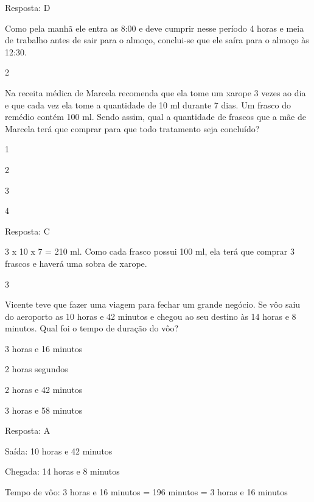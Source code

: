 Resposta: D

Como pela manhã ele entra as 8:00 e deve cumprir nesse período 4 horas e
meia de trabalho antes de sair para o almoço, conclui-se que ele saíra
para o almoço às 12:30.

\num{2}

Na receita médica de Marcela recomenda que ela tome um xarope 3 vezes ao
dia e que cada vez ela tome a quantidade de 10 ml durante 7 dias. Um
frasco do remédio contém 100 ml. Sendo assim, qual a quantidade de
frascos que a mãe de Marcela terá que comprar para que todo tratamento
seja concluído?

\begin{escolha}

\item
  1
\item
  2
\item
  3
\item
  4
\end{escolha}

Resposta: C

3 x 10 x 7 = 210 ml. Como cada frasco possui 100 ml, ela terá que
comprar 3 frascos e haverá uma sobra de xarope.

\num{3}

Vicente teve que fazer uma viagem para fechar um grande negócio. Se vôo
saiu do aeroporto as 10 horas e 42 minutos e chegou ao seu destino às 14
horas e 8 minutos. Qual foi o tempo de duração do vôo?

\begin{escolha}

\item
  3 horas e 16 minutos
\item
  2 horas segundos
\item
  2 horas e 42 minutos
\item
  3 horas e 58 minutos
\end{escolha}

Resposta: A

Saída: 10 horas e 42 minutos

Chegada: 14 horas e 8 minutos

Tempo de vôo: 3 horas e 16 minutos = 196 minutos = 3 horas e 16 minutos

\chapter{}


